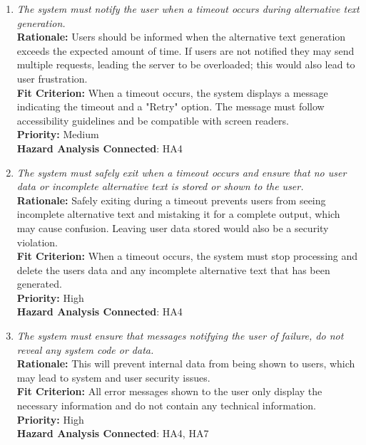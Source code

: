 \documentclass{article}
\begin{document}

\begin{enumerate}[label=PR-SR-HA \arabic*., wide=0pt, leftmargin=*]
  \item \emph{The system must notify the user when a timeout occurs during alternative text generation.}\\[2mm]
    {\bf Rationale:} Users should be informed when the alternative text generation exceeds the expected amount of time. If users are not notified they may send multiple requests, leading the server to be overloaded; this would also lead to user frustration.\\
    {\bf Fit Criterion:} When a timeout occurs, the system displays a message indicating the timeout and a "Retry" option. The message must follow accessibility guidelines and be compatible with screen readers.\\
    {\bf Priority:} Medium\\
    {\bf Hazard Analysis Connected}: HA4
  \item \emph{The system must safely exit when a timeout occurs and ensure that no user data or incomplete alternative text is stored or shown to the user.}\\[2mm]
    {\bf Rationale:} Safely exiting during a timeout prevents users from seeing incomplete alternative text and mistaking it for a complete output, which may cause confusion. Leaving user data stored would also be a security violation. \\
    {\bf Fit Criterion:} When a timeout occurs, the system must stop processing and delete the users data and any incomplete alternative text that has been generated.\\
    {\bf Priority:} High\\
    {\bf Hazard Analysis Connected}: HA4
  \item \emph{The system must ensure that messages notifying the user of failure, do not reveal any system code or data. }\\[2mm]
    {\bf Rationale:} This will prevent internal data from being shown to users, which may lead to system and user security issues. \\
    {\bf Fit Criterion:} All error messages shown to the user only display the necessary information and do not contain any technical information.\\
    {\bf Priority:} High \\
    {\bf Hazard Analysis Connected}: HA4, HA7
\end{enumerate}
\end{document}
